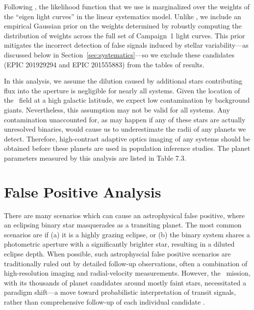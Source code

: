 Following \paperit, the likelihood function that we use is marginalized over
the weights of the ``eigen light curves'' in the linear systematics model.
Unlike \paperit, we include an empirical Gaussian prior on the weights
determined by robustly computing the distribution of weights across the full
set of Campaign~1 light curves.
This prior mitigates the incorrect detection of false signals induced by
stellar variability---as discussed below in Section~\ref{sec:systematics}---so
we exclude these candidates (EPIC 201929294 and EPIC 201555883) from the tables
of results.


In this analysis, we assume the dilution caused by additional stars
contributing flux into the aperture is negligible for nearly all systems.
Given the location of the \Ci\ field at a high galactic latitude, we expect
low contamination by background giants.
Nevertheless, this assumption may not be valid for all systems.
Any contamination unaccounted for, as may happen if any of these stars are
actually unresolved binaries, would cause us to underestimate the radii of any
planets we detect.
Therefore, high-contrast adaptive optics imaging of any systems should be
obtained before these planets are used in population inference studies.
The planet parameters measured by this analysis are listed in Table 7.3.



\section{False Positive Analysis}


There are many scenarios which can cause an astrophysical false positive,
where an eclipsing binary star masquerades as a transiting planet.
The most common scenarios are if (a) it is a highly grazing eclipse, or (b) the binary system
shares a photometric aperture with a significantly brighter star,
resulting in a diluted eclipse depth.
When possible, such astrophyscial false positive scenarios are traditionally
ruled out by detailed follow-up observations, often a combination of
high-resolution imaging and radial-velocity measurements.
However, the \kep\ mission, with its thousands of planet candidates
around mostly faint stars, necessitated a paradigm shift---a move
toward probabilistic interpretation of transit signals, rather than
comprehensive follow-up of each individual candidate \citep{Morton11b}.

